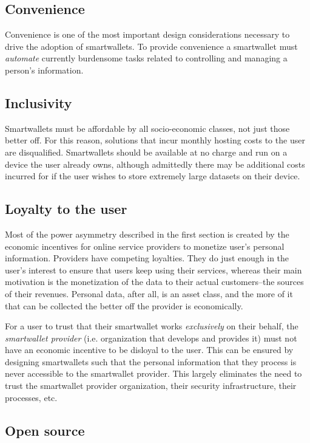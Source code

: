 \documentclass[11pt, oneside]{article}   	%
\begin{document}
\subsection{Convenience}

Convenience is one of the most important design considerations necessary to drive the adoption of smartwallets. To provide convenience a smartwallet must \emph{automate} currently burdensome tasks related to controlling and managing a person's information. 

\subsection{Inclusivity}

Smartwallets must be affordable by all socio-economic classes, not just those better off. For this reason, solutions that incur monthly hosting costs to the user are disqualified. Smartwallets should be available at no charge and run on a device the user already owns, although admittedly there may be additional costs incurred for if the user wishes to store extremely large datasets on their device.

\subsection{Loyalty to the user}
Most of the power asymmetry described in the first section is created by the economic incentives for online service providers to monetize user's personal information. Providers have competing loyalties. They do just enough in the user's interest to ensure that users keep using their services, whereas their main motivation is the monetization of the data to their actual customers--the sources of their revenues. Personal data, after all, is an asset class, and the more of it that can be collected the better off the provider is economically. 

For a user to trust that their smartwallet works \emph{exclusively} on their behalf, the \emph{smartwallet provider} (i.e. organization that develops and provides it) must not have an economic incentive to be disloyal to the user. This can be ensured by designing smartwallets such that the personal information that they process is never accessible to the smartwallet provider. This largely eliminates the need to trust the smartwallet provider organization, their security infrastructure, their processes, etc.

\subsection{Open source}
\end{document}

